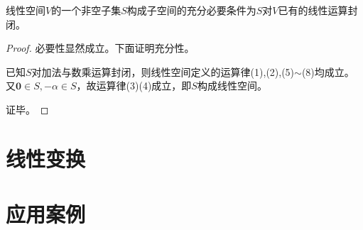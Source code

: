 \begin{theorem}
    线性空间$V$的一个非空子集$S$构成子空间的充分必要条件为$S$对$V$已有的线性运算封闭。
\end{theorem}

\begin{proof}
    必要性显然成立。下面证明充分性。

    已知$S$对加法与数乘运算封闭，则线性空间定义的运算律(1),(2),(5)$\sim$(8)均成立。
    又$\mathbf{0}\in{S},-\alpha\in{S}$，故运算律(3)(4)成立，即$S$构成线性空间。

    证毕。
\end{proof}

\section{线性变换}
\section{应用案例}
